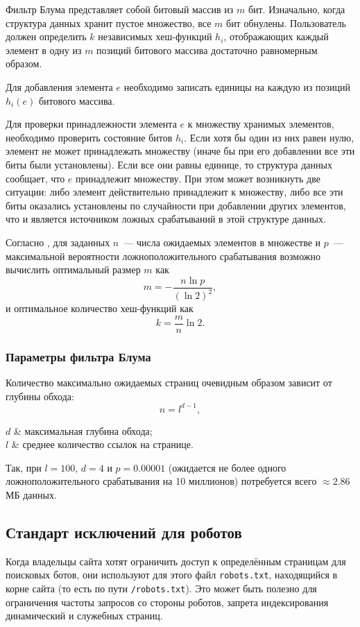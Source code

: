 Фильтр Блума представляет собой битовый массив из $m$ бит. Изначально, когда структура данных хранит пустое множество, все $m$ бит обнулены. Пользователь должен определить $k$ независимых хеш-функций $h_i$, отображающих каждый элемент в одну из $m$ позиций битового массива достаточно равномерным образом.

Для добавления элемента $e$ необходимо записать единицы на каждую из позиций $h_i(e)$ битового массива.

Для проверки принадлежности элемента $e$ к множеству хранимых элементов, необходимо проверить состояние битов $h_i$. Если хотя бы один из них равен нулю, элемент не может принадлежать множеству (иначе бы при его добавлении все эти биты были установлены). Если все они равны единице, то структура данных сообщает, что $e$ принадлежит множеству. При этом может возникнуть две ситуации: либо элемент действительно принадлежит к множеству, либо все эти биты оказались установлены по случайности при добавлении других элементов, что и является источником ложных срабатываний в этой структуре данных.

Согласно \cite{broder02}, для заданных $n$~--- числа ожидаемых элементов в множестве и $p$~--- максимальной вероятности ложноположительного срабатывания возможно вычислить оптимальный размер $m$ как
\begin{equation}
  m=-\frac{n\ln p}{(\ln 2)^2},
\end{equation}
и оптимальное количество хеш-функций как
\begin{equation}
  k=\frac{m}{n}\ln 2.
\end{equation}


\subsubsection{Параметры фильтра Блума}
Количество максимально ожидаемых страниц очевидным образом зависит от глубины обхода:
\begin{equation}
  n=l^{d-1},
\end{equation}
\begin{conditions}
  $d$ & максимальная глубина обхода;\\
  $l$ & среднее количество ссылок на странице.
\end{conditions}

Так, при $l=100$, $d=4$ и $p=0.00001$ (ожидается не более одного ложноположительного срабатывания на 10 миллионов) потребуется всего $\approx 2.86$МБ данных.


\subsection{Стандарт исключений для роботов} \label{ssec:robotstxt}
Когда владельцы сайта хотят ограничить доступ к определённым страницам для поисковых ботов, они используют для этого файл \verb|robots.txt|, находящийся в корне сайта (то есть по пути \verb|/robots.txt|). Это может быть полезно для ограничения частоты запросов со стороны роботов, запрета индексирования динамический и служебных страниц.

